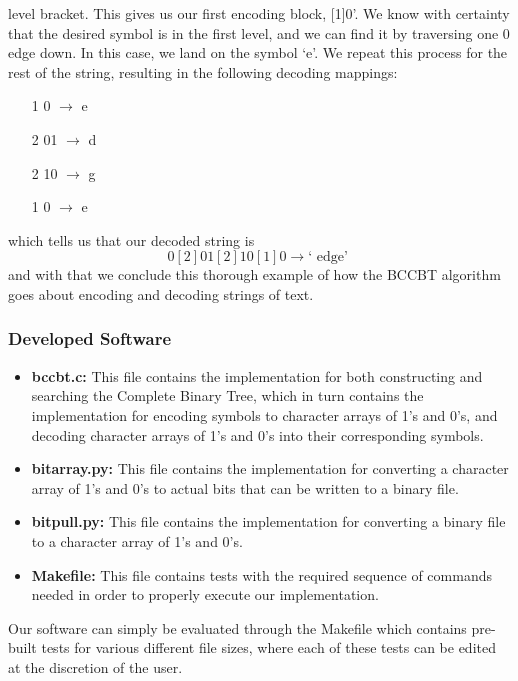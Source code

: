 \documentclass[12pt]{IEEEtran}
\begin{document}
level bracket. This gives us our first encoding block, [1]0'. We know with certainty that the desired symbol is in the first level, and we can 
find it by traversing one 0 edge down. In this case, we land on the symbol `e'. We repeat this process for the rest of the string, resulting in the 
following decoding mappings:
\begin{enumerate}
	\item [1]0 $\rightarrow$ e
	\item [2]01 $\rightarrow$ d
	\item [2]10 $\rightarrow$ g
	\item [1]0 $\rightarrow$ e
\end{enumerate}
which tells us that our decoded string is 
\begin{equation*}
	[1]0[2]01[2]10[1]0 \rightarrow \text{` edge' }
\end{equation*}
and with that we conclude this thorough example of how the BCCBT algorithm goes about encoding and decoding strings of text.\\
\subsubsection{Developed Software}
\begin{itemize}
\item \textbf{bccbt.c:} This file contains the implementation for both constructing and searching the Complete Binary Tree,
which in turn contains the implementation for encoding symbols to character arrays of 1's and 0's,
and decoding character arrays of 1's and 0's into their corresponding symbols.
\item \textbf{bitarray.py:} This file contains the implementation for converting a character array of 1's and 0's
to actual bits that can be written to a binary file.
\item \textbf{bitpull.py:} This file contains the implementation for converting a binary file to a character
array of 1's and 0's.
\item \textbf{Makefile:} This file contains tests with the required sequence of commands needed
in order to properly execute our implementation.
\end{itemize}
Our software can simply be evaluated through the Makefile which contains pre-built tests for various different file sizes,
where each of these tests can be edited at the discretion of the user.
\end{document}
